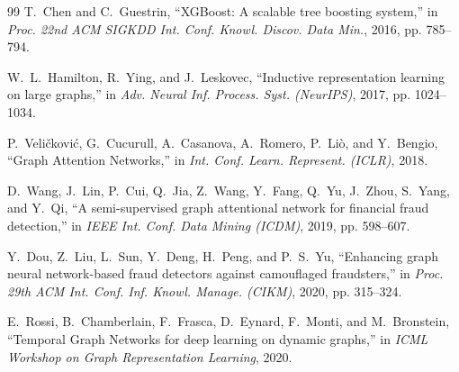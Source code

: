 \documentclass[11pt,a4paper]{report}
\begin{document}
\begin{thebibliography}{99}
T.~Chen and C.~Guestrin, ``XGBoost: A scalable tree boosting system,'' in \emph{Proc. 22nd ACM SIGKDD Int. Conf. Knowl. Discov. Data Min.}, 2016, pp. 785--794.

W.~L.~Hamilton, R.~Ying, and J.~Leskovec, ``Inductive representation learning on large graphs,'' in \emph{Adv. Neural Inf. Process. Syst. (NeurIPS)}, 2017, pp. 1024--1034.

P.~Veli\v{c}kovi\'{c}, G.~Cucurull, A.~Casanova, A.~Romero, P.~Li\`{o}, and Y.~Bengio, ``Graph Attention Networks,'' in \emph{Int. Conf. Learn. Represent. (ICLR)}, 2018.

D.~Wang, J.~Lin, P.~Cui, Q.~Jia, Z.~Wang, Y.~Fang, Q.~Yu, J.~Zhou, S.~Yang, and Y.~Qi, ``A semi-supervised graph attentional network for financial fraud detection,'' in \emph{IEEE Int. Conf. Data Mining (ICDM)}, 2019, pp. 598--607.

Y.~Dou, Z.~Liu, L.~Sun, Y.~Deng, H.~Peng, and P.~S.~Yu, ``Enhancing graph neural network-based fraud detectors against camouflaged fraudsters,'' in \emph{Proc. 29th ACM Int. Conf. Inf. Knowl. Manage. (CIKM)}, 2020, pp. 315--324.

E.~Rossi, B.~Chamberlain, F.~Frasca, D.~Eynard, F.~Monti, and M.~Bronstein, ``Temporal Graph Networks for deep learning on dynamic graphs,'' in \emph{ICML Workshop on Graph Representation Learning}, 2020.
\end{thebibliography}
\end{document}
